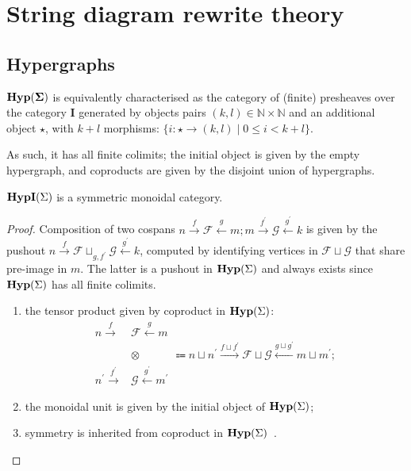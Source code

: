 \section{String diagram rewrite theory}
\label{sec:appendix:hyp}

\subsection{Hypergraphs}

\begin{prop}
	$\mathbf{Hyp(\Sigma)}$ is equivalently characterised as the category of (finite) presheaves over the category $\mathbf{I}$ generated by objects pairs $(k, l) \in \mathbb{N} \times \mathbb{N}$ and an additional object $\star$, with $k + l$ morphisms: $\{ i\colon \star \to (k, l) \mid 0 \leq i < k + l \}$.
\end{prop}
As such, it has all finite colimits; the initial object is given by the empty hypergraph, and coproducts are given by the disjoint union of hypergraphs.

\begin{prop}
	$\textbf{HypI}(\Sigma)$ is a symmetric monoidal category.
\end{prop}
\begin{proof}
	Composition of two cospans $n \xrightarrow{f} \mathcal{F} \xleftarrow{g} m;m \xrightarrow{f^\prime} \mathcal{G} \xleftarrow{g^\prime} k$ is given by the pushout
	$
		n \xrightarrow{f} \mathcal{F} \sqcup_{g,f^\prime} \mathcal{G} \xleftarrow{g^\prime} k
	$,
	computed by identifying vertices in $\mathcal{F} \sqcup \mathcal{G}$ that share pre-image in $m$.
	The latter is a pushout in $\mathbf{Hyp}(\Sigma)$ and always exists since $\mathbf{Hyp}(\Sigma)$ has all finite colimits.
	\begin{enumerate}
		\item the tensor product given by coproduct in $\mathbf{Hyp}(\Sigma)$:
		      \begin{align*}
			      n \xrightarrow{f}               & \mathcal{F} \xleftarrow{g} m                                                                                                                                       \\
			                                      & \otimes \qquad \quad \Coloneqq n \sqcup n^\prime \xrightarrow{f \sqcup f^\prime} \mathcal{F} \sqcup \mathcal{G} \xleftarrow{g \sqcup g^\prime} m \sqcup m^\prime ; \\
			      n^\prime \xrightarrow{f^\prime} & \mathcal{G} \xleftarrow{g^\prime} m^\prime
		      \end{align*}
		\item the monoidal unit is given by the initial object of $\mathbf{Hyp}(\Sigma)$;
		\item symmetry is inherited from coproduct in $\mathbf{Hyp}(\Sigma)$~\cite{MonoidalCoproduct}.
	\end{enumerate}
\end{proof}

